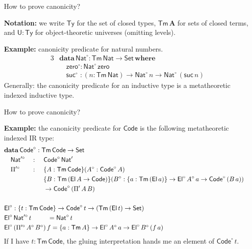 \documentclass[dvipsnames,aspectratio=169]{beamer}
\newcommand{\ms}[1]{\mathsf{#1}}
\newcommand{\mbf}[1]{\mathbf{#1}}
\newcommand{\bs}[1]{\boldsymbol{#1}}
\newcommand{\data}{\mbf{data}}
\newcommand{\U}{\ms{U}}
\newcommand{\Set}{\ms{Set}}
\newcommand{\where}{\mbf{where}}
\newcommand{\Nat}{\ms{Nat}}
\newcommand{\zero}{\ms{zero}}
\newcommand{\suc}{\ms{suc}}
\newcommand{\El}{\ms{El}}
\newcommand{\Code}{\ms{Code}}
\newcommand{\Ty}{\ms{Ty}}
\newcommand{\Tm}{\ms{Tm}}
\newcommand{\w}{\circ}
\begin{document}
\begin{frame}{How to prove canonicity?}

\textbf{Notation:} we write $\bs{\Ty}$ for the set of closed types, $\bs{\Tm\,A}$ for sets of closed terms,
  and $\bs{\U : \Ty}$ for object-theoretic universes (omitting levels).
\vspace{1em}

\textbf{Example:} canonicity predicate for natural numbers.
\begin{alignat*}{3}
  &\data\,\Nat^\w : \Tm\,\Nat \to \Set\,\where\\
  & \quad \zero^\w : \Nat^\w\,\zero\\
  & \quad \suc^\w\,\,: (n : \Tm\,\Nat) \to \Nat^\w\,n \to \Nat^\w\,(\suc\,n)
\end{alignat*}
Generally: the canonicity predicate for an inductive type is a \alert{metatheoretic indexed inductive type}.


\end{frame}

\begin{frame}{How to prove canonicity?}

\textbf{Example:} the canonicity predicate for $\Code$ is the following \alert{metatheoretic indexed IR type}:
\begin{alignat*}{4}
  &\rlap{$\data\,\Code^\w : \Tm\,\Code \to \Set$}\\
  &\quad\Nat'^\w &&: \,\,&& \Code^\w\,\Nat'\\
  &\quad\Pi'^\w  &&: \,\,&&\{A : \Tm\,\Code\}(A^\w : \Code^\w\,A)\\
  &\quad         &&  && \{B : \Tm\,(\El\,A \to \Code)\}(B^\w : \{a : \Tm\,(\El\,a)\} \to \El^\w\,A^\w\,a \to \Code^\w\,(B\,a))\\
  &\quad         &&  && \to \Code^\w\,(\Pi'\,A\,B)\\
  &\rlap{}\\
  &\rlap{$\El^\w : \{t : \Tm\,\Code\} \to \Code^\w\,t \to (\Tm\,(\El\,t) \to \Set)$}\\
  &\rlap{$\El^\w\,\Nat'^\w\,t \hspace{2.55em}= \Nat^\w\,t$}  \\
  &\rlap{$\El^\w\,(\Pi'^\w\,A^\w\,B^\w)\,f = \{a : \Tm\,A\} \to \El^\w\,A^\w\,a \to \El^\w\,B^\w\,(f\,a)$}
\end{alignat*}
If I have $t : \Tm\,\Code$, the gluing interpretation hands me an element of $\Code^\w\,t$.

\end{frame}
\end{document}
